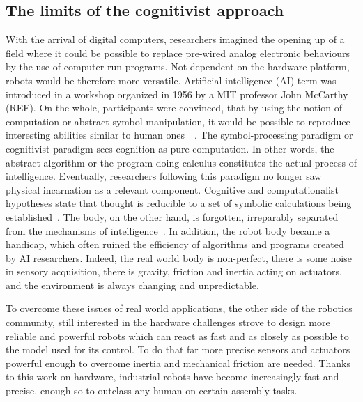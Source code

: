 \subsection{The limits of the cognitivist approach} %


With the arrival of digital computers, researchers imagined the opening up of a field where it could be possible to replace pre-wired analog electronic behaviours by the use of computer-run programs. Not dependent on the hardware platform, robots would be therefore more versatile.
Artificial intelligence (AI) term was introduced in a workshop organized in 1956 by a MIT professor John McCarthy (REF). On the whole, participants were convinced, that by using the notion of computation or abstract symbol manipulation, it would be possible to reproduce interesting abilities similar to human ones~\cite{kaufmann1979machines}~\cite{haugeland1989artificial}. The symbol-processing paradigm or cognitivist paradigm sees cognition as pure computation. In other words, the abstract algorithm or the program doing calculus constitutes the actual process of intelligence. Eventually, researchers following this paradigm no longer saw physical incarnation as a relevant component. Cognitive and computationalist hypotheses state that thought is reducible to a set of symbolic calculations being established~\cite{fodor1987psychosemantics}. The body, on the other hand, is forgotten, irreparably separated from the mechanisms of intelligence~\cite{kaplan2008corps}.
In addition, the robot body became a handicap, which often ruined the efficiency of algorithms and programs created by AI researchers. Indeed, the real world body is non-perfect, there is some noise in sensory acquisition, there is gravity, friction and inertia acting on actuators, and the environment is always changing and unpredictable.

To overcome these issues of real world applications, the other side of the robotics community, still interested in the hardware challenges strove to design more reliable and powerful robots which can react as fast and as closely as possible to the model used for its control. To do that far more precise sensors and actuators powerful enough to overcome inertia and mechanical friction are needed. Thanks to this work on hardware, industrial robots have become increasingly fast and precise, enough so to outclass any human on certain assembly tasks.

